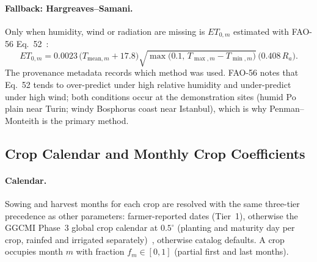 \paragraph{Fallback: Hargreaves--Samani.}
Only when humidity, wind or radiation are missing is $ET_{0,m}$ estimated with FAO-56 Eq.~52~\cite{hargreaves1985reference,allen1998fao56}:
\begin{equation}
  ET_{0,m} = 0.0023 \, \bigl(T_{\mathrm{mean},m} + 17.8\bigr) \sqrt{\max\!\bigl(0.1,\, T_{\max,m} - T_{\min,m}\bigr)} \, \bigl(0.408\, R_a\bigr).
\end{equation}
The provenance metadata records which method was used. FAO-56 notes that Eq.~52 tends to over-predict under high relative humidity and under-predict under high wind; both conditions occur at the demonstration sites (humid Po plain near Turin; windy Bosphorus coast near Istanbul), which is why Penman--Monteith is the primary method.

\subsection{Crop Calendar and Monthly Crop Coefficients}
\label{sec:calendar}
\paragraph{Calendar.} Sowing and harvest months for each crop are resolved with the same three-tier precedence as other parameters: farmer-reported dates (Tier~1), otherwise the GGCMI Phase~3 global crop calendar at $0.5^{\circ}$ (planting and maturity day per crop, rainfed and irrigated separately)~\cite{jagermeyr2021calendar}, otherwise catalog defaults. A crop occupies month $m$ with fraction $f_m \in [0,1]$ (partial first and last months).

